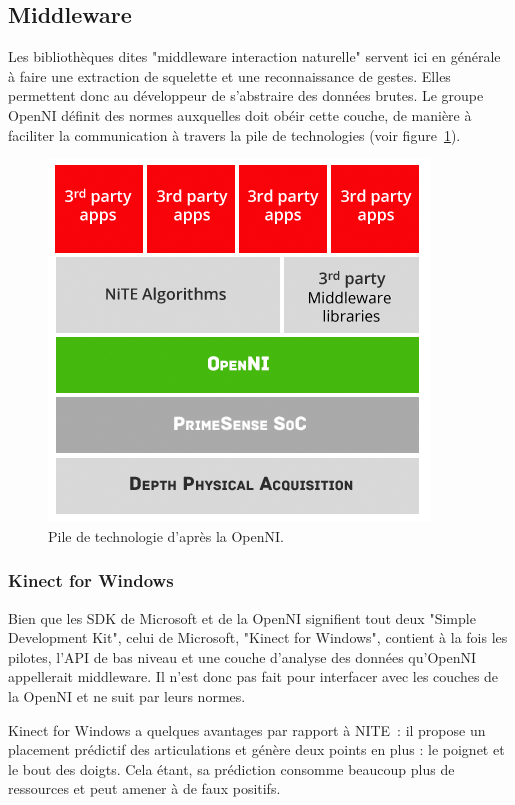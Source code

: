 
\subsection{Middleware}
Les bibliothèques dites "middleware interaction naturelle" servent ici en 
générale à faire une 
extraction de squelette et une reconnaissance de gestes. Elles permettent donc 
au développeur de s'abstraire des données brutes. Le groupe OpenNI définit 
des normes auxquelles doit obéir cette couche, de 
manière à faciliter la communication à travers la pile de technologies (voir 
figure~\ref{fig:openni_technology_stack}).
\begin{figure}[h!]
\centering
\includegraphics[width=0.7\linewidth]{images/openni_technology_stack}
\caption{Pile de technologie d'après la OpenNI.}
\label{fig:openni_technology_stack}
\end{figure}


\subsubsection{Kinect for Windows}  
Bien que les SDK de Microsoft et de la OpenNI signifient tout deux 
"Simple Development Kit",
celui de Microsoft, "Kinect for Windows", contient à la fois les pilotes, 
l'API de bas niveau et une couche d'analyse des données qu'OpenNI appellerait 
middleware. Il n'est donc pas fait pour interfacer avec les couches de la 
OpenNI et ne suit par leurs normes.

Kinect for Windows a quelques avantages par rapport à NITE~: il propose un
placement prédictif des articulations et génère deux points en plus :
le poignet et le bout des doigts. Cela étant, sa prédiction consomme beaucoup 
plus de ressources et peut amener à de faux positifs\cite{microsoft_vs_openni}.

